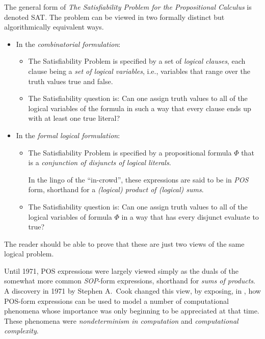 
The general form of {\it The Satisfiability Problem for the
  Propositional Calculus} 
is denoted {\sf SAT}.  
The problem can be viewed in two formally distinct but algorithmically
equivalent ways.
\begin{itemize}
\item
In the {\it combinatorial formulation}:
  \begin{itemize}
  \item
The Satisfiability Problem is specified by a set of {\it logical
  clauses}, each clause being a {\it set of {\em logical} variables},
i.e., variables that range over the truth values {\sc true} and
{\sc false}.
  \item
The Satisfiability question is: Can one assign truth values to all of
the logical variables of the formula in such a way that every clause
ends up with at least one {\sc true} literal?
  \end{itemize}
\item
In the {\it formal logical formulation}:
  \begin{itemize}
  \item
The Satisfiability Problem is specified by a propositional formula
$\Phi$ that is  a {\it conjunction of disjuncts of logical literals}.

In the lingo of the ``in-crowd'', these expressions are said to be in
{\it POS} form,  shorthand for a {\it
  (logical) product of (logical) sums}.
  \item
The Satisfiability question is: Can one assign truth values to all of
the logical variables of formula $\Phi$ in a way that has every disjunct
evaluate to {\sc true}?
  \end{itemize}
\end{itemize}
The reader should be able to prove that these are just two views of
the same logical problem.

Until 1971, POS expressions were largely viewed simply as the duals of
the somewhat more common {\it SOP}-form expressions, shorthand for {\it sums of products}.  A
discovery in 1971 by Stephen A.~Cook   changed
this view, by exposing, in \cite{Cook71}, how POS-form expressions can
be used to model a number of computational phenomena whose importance
was only beginning to be appreciated at that time.  These phenomena
were {\it nondeterminism in computation}
 and {\it computational complexity}.

